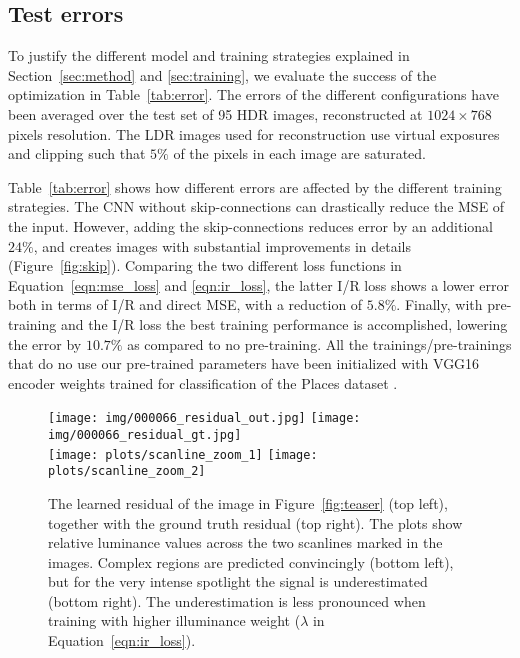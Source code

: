 \documentclass[acmtog]{acmart}
\newcommand{\figref}[1]{Figure~\ref{fig:#1}}
\newcommand{\tabref}[1]{Table~\ref{tab:#1}}
\newcommand{\eqnref}[1]{Equation~\ref{eqn:#1}}
\newcommand{\secref}[1]{Section~\ref{sec:#1}}
\newcommand\belowfigspace{-2pt}
\newcommand\customsection[1]{\subsection{#1}}
\begin{document}
\customsection{Test errors}
To justify the different model and training strategies explained in \secref{method} and \ref{sec:training}, we evaluate the success of the optimization in \tabref{error}. The errors of the different configurations have been averaged over the test set of 95 HDR images, reconstructed at $1024 \times 768$ pixels resolution. The LDR images used for reconstruction use virtual exposures and clipping such that $5\%$ of the pixels in each image are saturated. 

\tabref{error} shows how different errors are affected by the different training strategies. The CNN without skip-connections can drastically reduce the MSE of the input. However, adding the skip-connections reduces error by an additional $24\%$, and creates images with substantial improvements in details (\figref{skip}). Comparing the two different loss functions in \eqnref{mse_loss} and \ref{eqn:ir_loss}, the latter I/R loss shows a lower error both in terms of I/R and direct MSE, with a reduction of $5.8\%$. Finally, with pre-training and the I/R loss the best training performance is accomplished, lowering the error by $10.7\%$ as compared to no pre-training. All the trainings/pre-trainings that do no use our pre-trained parameters have been initialized with VGG16 encoder weights trained for classification of the Places dataset \cite{Zhou2014}.

\begin{figure}
	\vspace{5pt}
	\newcommand\ww{0.235}
	\centering
	\texttt{[image: img/000066\_residual\_out.jpg]}
	\texttt{[image: img/000066\_residual\_gt.jpg]}
	\vspace{-2pt}\\
	\texttt{[image: plots/scanline\_zoom\_1]}
	\texttt{[image: plots/scanline\_zoom\_2]}
	\vspace{-7pt}\\
	\caption{\label{fig:residual} The learned residual of the image in \figref{teaser} (top left), together with the ground truth residual (top right). The plots show relative luminance values across the two scanlines marked in the images. Complex regions are predicted convincingly (bottom left), but for the very intense spotlight the signal is underestimated (bottom right). The underestimation is less pronounced when training with higher illuminance weight ($\lambda$ in \eqnref{ir_loss}). }
	\vspace{\belowfigspace}
\end{figure}
\end{document}
